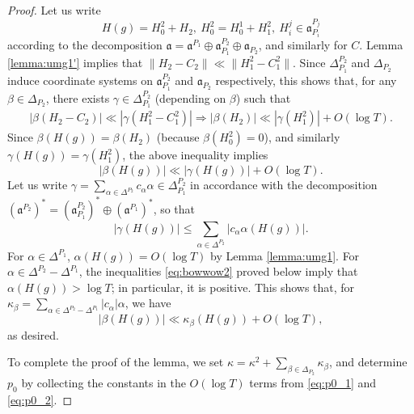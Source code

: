 \documentclass[11pt]{amsart}
\numberwithin{theorem}{section}
\numberwithin{equation}{section}
\theoremstyle{remark}
\theoremstyle{definition}
\newcommand{\ga}{\mathfrak{a}}
\begin{document}
\begin{proof}
Let us write
\begin{equation*}
H(g) = H_0^2 + H_2, \ H_0^2 = H_0^1 + H_1^2, \  H_i^j \in \ga_{P_i}^{P_j}
\end{equation*}
according to the decomposition $\ga = \ga^{P_1}\oplus\ga_{P_1}^{P_2}\oplus\ga_{P_2}$, and similarly for $C$. Lemma \ref{lemma:umg1'} implies that $\|H_2-C_2\| \ll \|H_1^2 - C_1^2\|$. Since $\Delta_{P_1}^{P_2}$ and $\Delta_{P_2}$ induce coordinate systems on $\ga_{P_1}^{P_2}$ and $\ga_{P_2}$ respectively, this shows that, for any $\beta \in \Delta_{P_2}$, there exists $\gamma \in \Delta_{P_1}^{P_2}$ (depending on $\beta$) such that
\begin{align*}
|\beta(H_2 - C_2)| \ll |\gamma(H_1^2 - C_1^2)| \Rightarrow |\beta(H_2)| \ll |\gamma(H_1^2)| + O(\log T).
\end{align*}
Since $\beta(H(g)) = \beta(H_2)$ (because $\beta(H_0^2) = 0$), and similarly $\gamma(H(g)) = \gamma(H_1^2)$, the above inequality implies
\begin{equation*}
|\beta(H(g))| \ll |\gamma(H(g))| + O(\log T).
\end{equation*}
Let us write $\gamma = \sum_{\alpha \in \Delta^{P_2}} c_\alpha \alpha \in \Delta_{P_1}^{P_2}$ in accordance with the decomposition $(\ga^{P_2})^* = (\ga_{P_1}^{P_2})^*\oplus(\ga^{P_1})^*$, so that
\begin{equation*}
|\gamma(H(g))| \leq \sum_{\alpha \in \Delta^{P_2}} |c_\alpha \alpha(H(g))|.
\end{equation*}
For $\alpha \in \Delta^{P_1}$, $\alpha(H(g)) = O(\log T)$ by Lemma \ref{lemma:umg1}. For $\alpha \in \Delta^{P_2} - \Delta^{P_1}$, the inequalities \eqref{eq:bowwow2} proved below imply that $\alpha(H(g)) > \log T$; in particular, it is positive. This shows that, for $\kappa_\beta = \sum_{\alpha \in \Delta^{P_2} - \Delta^{P_1}} |c_\alpha|\alpha$, we have
\begin{equation}\label{eq:p0_2}
|\beta(H(g))| \ll \kappa_\beta(H(g)) + O(\log T),
\end{equation}
as desired.

To complete the proof of the lemma, we set $\kappa = \kappa^2+\sum_{\beta \in \Delta_{P_2}}\kappa_\beta$, and determine $p_0$ by collecting the constants in the $O(\log T)$ terms from \eqref{eq:p0_1} and \eqref{eq:p0_2}.
\end{proof}
\end{document}
